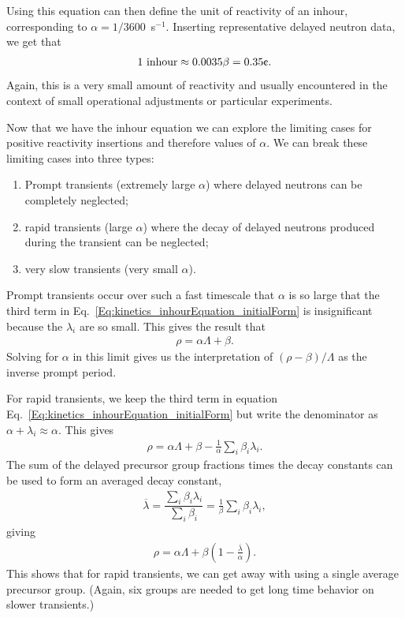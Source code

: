 Using this equation can then define the unit of reactivity of an inhour, corresponding to $\alpha = 1/3600$~s$^{-1}$. Inserting representative delayed neutron data, we get that
\begin{align}
  1 \text{ inhour} \approx 0.0035 \beta = 0.35\text{\textcent} . \nonumber
\end{align}
Again, this is a very small amount of reactivity and usually encountered in the context of small operational adjustments or particular experiments.

Now that we have the inhour equation we can explore the limiting cases for positive reactivity insertions and therefore values of $\alpha$. We can break these limiting cases into three types:
\begin{enumerate}
  \item Prompt transients (extremely large $\alpha$) where delayed neutrons can be completely neglected;
  \item rapid transients (large $\alpha$) where the decay of delayed neutrons produced during the transient can be neglected;
  \item very slow transients (very small $\alpha$).
\end{enumerate}

Prompt transients occur over such a fast timescale that $\alpha$ is so large that the third term in Eq.~\eqref{Eq:kinetics_inhourEquation_initialForm} is insignificant because the $\lambda_i$ are so small. This gives the result that
\begin{align}
  \rho = \alpha \Lambda + \beta.
\end{align}
Solving for $\alpha$ in this limit gives us the interpretation of $(\rho - \beta)/\Lambda$ as the inverse prompt period.

For rapid transients, we keep the third term in equation Eq.~\eqref{Eq:kinetics_inhourEquation_initialForm} but write the denominator as $\alpha + \lambda_i \approx \alpha$. This gives
\begin{align}
  \rho = \alpha \Lambda + \beta - \frac{1}{\alpha} \sum_i \beta_i \lambda_i .
\end{align}
The sum of the delayed precursor group fractions times the decay constants can be used to form an averaged decay constant,
\begin{align}
  \overline{\lambda} = \dfrac{ \displaystyle\sum_i \beta_i \lambda_i }{ \displaystyle\sum_i \beta_i } = \frac{1}{\beta} \displaystyle\sum_i \beta_i \lambda_i ,
\end{align}
giving
\begin{align}
  \rho = \alpha \Lambda + \beta \left( 1 - \frac{\overline{\lambda}}{\alpha} \right) .
\end{align}
This shows that for rapid transients, we can get away with using a single average precursor group. (Again, six groups are needed to get long time behavior on slower transients.) 

